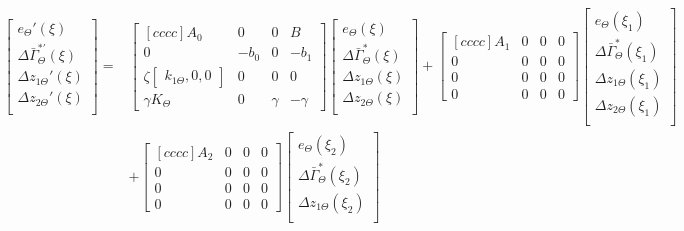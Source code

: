 \documentclass[main.tex]{subfiles}
\begin{document}
\begin{align}
	\begin{bmatrix}
		e_\Theta'(\xi) \\
		\Delta \bar{\Gamma}_\Theta^{*'}(\xi) \\
		\Delta z_{1\Theta}'(\xi) \\
		\Delta z_{2\Theta}'(\xi) \\
	\end{bmatrix} =& 
	\begin{bmatrix}[cccc]
	A_0 & 0 & 0 & B\\
	0 & -b_0 & 0 & -b_1\\
	\zeta \begin{bmatrix}k_{1\Theta} , 0 , 0\end{bmatrix} & 0 & 0 & 0\\
	\gamma K_\Theta & 0 & \gamma & -\gamma
	\end{bmatrix}
	\begin{bmatrix}
	e_\Theta(\xi) \\
	\Delta \bar{\Gamma}_\Theta^{*}(\xi) \\
	\Delta z_{1\Theta}(\xi) \\
	\Delta z_{2\Theta}(\xi) \\
	\end{bmatrix} + 
	\begin{bmatrix}[cccc]
	A_1 & 0 & 0 & 0\\
	0 & 0 & 0 & 0\\
	0 & 0 & 0 & 0\\
	0 & 0 & 0 & 0 
	\end{bmatrix}
	\begin{bmatrix}
	e_\Theta(\xi_1) \\
	\Delta \bar{\Gamma}_\Theta^{*}(\xi_1) \\
	\Delta z_{1\Theta}(\xi_1) \\
	\Delta z_{2\Theta}(\xi_1) \\
	\end{bmatrix} \nonumber\\
	&+ 
	\begin{bmatrix}[cccc]
	A_2 & 0 & 0 & 0\\
	0 & 0 & 0 & 0\\
	0 & 0 & 0 & 0\\
	0 & 0 & 0 & 0 
	\end{bmatrix}
	\begin{bmatrix}
	e_\Theta(\xi_2) \\
	\Delta \bar{\Gamma}_\Theta^{*}(\xi_2) \\
	\Delta z_{1\Theta}(\xi_2) \\

\end{bmatrix}
\end{align}
\end{document}
